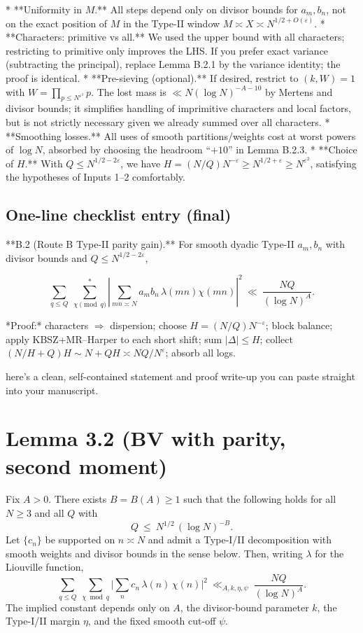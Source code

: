 \documentclass[11pt]{article}
\theoremstyle{definition}
\theoremstyle{remark}
\begin{document}
* **Uniformity in $M$.** All steps depend only on divisor bounds for $a_m,b_n$, not on the exact position of $M$ in the Type-II window $M\asymp X\asymp N^{1/2+O(\varepsilon)}$.
* **Characters: primitive vs all.** We used the upper bound with all characters; restricting to primitive only improves the LHS. If you prefer exact variance (subtracting the principal), replace Lemma B.2.1 by the variance identity; the proof is identical.
* **Pre-sieving (optional).** If desired, restrict to $(k,W)=1$ with $W=\prod_{p\le N^{\varepsilon^3}}p$. The lost mass is $\ll N(\log N)^{-A-10}$ by Mertens and divisor bounds; it simplifies handling of imprimitive characters and local factors, but is not strictly necessary given we already summed over all characters.
* **Smoothing losses.** All uses of smooth partitions/weights cost at worst powers of $\log N$, absorbed by choosing the headroom “$+10$” in Lemma B.2.3.
* **Choice of $H$.** With $Q\le N^{1/2-2\varepsilon}$, we have $H=(N/Q)N^{-\varepsilon}\ge N^{1/2+\varepsilon}\ge N^{\varepsilon^2}$, satisfying the hypotheses of Inputs 1–2 comfortably.


\subsection*{One-line checklist entry (final)}

**B.2 (Route B Type-II parity gain).** For smooth dyadic Type-II $a_m,b_n$ with divisor bounds and $Q\le N^{1/2-2\varepsilon}$,

$$
\sum_{q\le Q}\ \sum_{\chi\!\!\!\pmod q}^{\!*}\left|\sum_{mn\asymp N} a_m b_n\,\lambda(mn)\chi(mn)\right|^2
\ \ll\ \frac{NQ}{(\log N)^{A}}.
$$

*Proof:* characters $\Rightarrow$ dispersion; choose $H=(N/Q)N^{-\varepsilon}$; block balance; apply KBSZ+MR–Harper to each short shift; sum $|\Delta|\le H$; collect $(N/H+Q)H\sim N\!+\!QH\asymp NQ/N^{\varepsilon}$; absorb all logs.

here’s a clean, self-contained statement and proof write-up you can paste straight into your manuscript.

\section*{Lemma 3.2 (BV with parity, second moment)}

Fix $A>0$. There exists $B=B(A)\ge 1$ such that the following holds for all $N\ge 3$ and all $Q$ with
\[
Q\ \le\ N^{1/2}\,(\log N)^{-B}.
\]
Let $\{c_n\}$ be supported on $n\asymp N$ and admit a Type-I/II decomposition with smooth weights and divisor bounds in the sense below. Then, writing $\lambda$ for the Liouville function,
\begin{equation}\label{eq:BV-parity}
\sum_{q\le Q}\ \sum_{\chi\bmod q}
\Bigg|\sum_{n} c_n\,\lambda(n)\,\chi(n)\Bigg|^2
\ \ll_{A,k,\eta,\psi}\ \frac{NQ}{(\log N)^A}.
\end{equation}
The implied constant depends only on $A$, the divisor-bound parameter $k$, the Type-I/II margin $\eta$, and the fixed smooth cut-off $\psi$.
\end{document}
